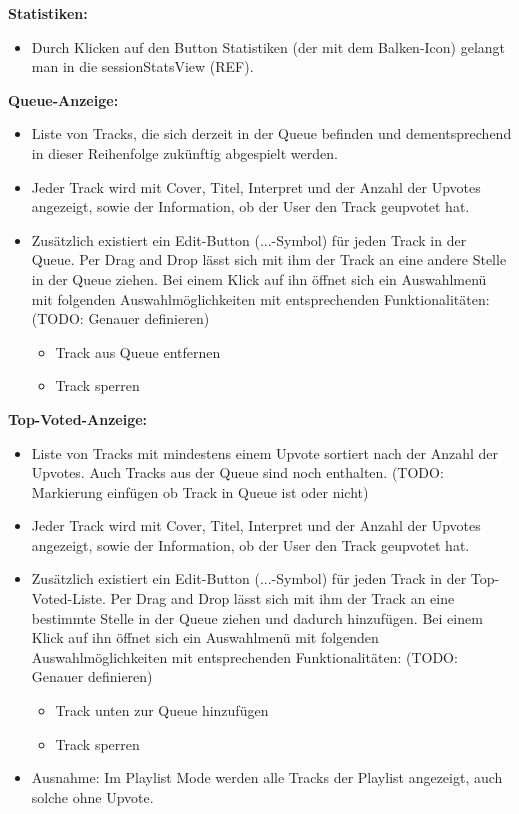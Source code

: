 \documentclass[oneside, ngerman]{sdqtechreport}
\begin{document}
\textbf{Statistiken:}
\begin{itemize}
    \item Durch Klicken auf den Button Statistiken (der mit dem Balken-Icon) gelangt man in die sessionStatsView (REF).
\end{itemize}

\textbf{Queue-Anzeige:}
\begin{itemize}
    \item Liste von Tracks, die sich derzeit in der Queue befinden und dementsprechend in dieser Reihenfolge zukünftig abgespielt werden.
    \item Jeder Track wird mit Cover, Titel, Interpret und der Anzahl der Upvotes angezeigt, sowie der Information, ob der User den Track geupvotet hat.
    \item Zusätzlich existiert ein Edit-Button (...-Symbol) für jeden Track in der Queue. Per Drag and Drop lässt sich mit ihm der Track an eine andere Stelle in der Queue ziehen. Bei einem Klick auf ihn öffnet sich ein Auswahlmenü mit folgenden Auswahlmöglichkeiten mit entsprechenden Funktionalitäten: (TODO: Genauer definieren)
    \begin{itemize}
        \item Track aus Queue entfernen
        \item Track sperren
    \end{itemize}
\end{itemize}

\textbf{Top-Voted-Anzeige:}
\begin{itemize}
    \item Liste von Tracks mit mindestens einem Upvote sortiert nach der Anzahl der Upvotes. Auch Tracks aus der Queue sind noch enthalten. (TODO: Markierung einfügen ob Track in Queue ist oder nicht)
    \item Jeder Track wird mit Cover, Titel, Interpret und der Anzahl der Upvotes angezeigt, sowie der Information, ob der User den Track geupvotet hat.
    \item Zusätzlich existiert ein Edit-Button (...-Symbol) für jeden Track in der Top-Voted-Liste. Per Drag and Drop lässt sich mit ihm der Track an eine bestimmte Stelle in der Queue ziehen und dadurch hinzufügen. Bei einem Klick auf ihn öffnet sich ein Auswahlmenü mit folgenden Auswahlmöglichkeiten mit entsprechenden Funktionalitäten: (TODO: Genauer definieren)
    \begin{itemize}
        \item Track unten zur Queue hinzufügen
        \item Track sperren
    \end{itemize}
    \item Ausnahme: Im Playlist Mode werden alle Tracks der Playlist angezeigt, auch solche ohne Upvote.
\end{itemize}
\end{document}

